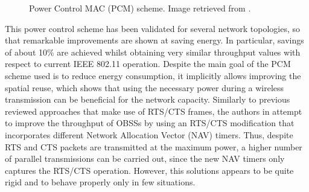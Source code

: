 \documentclass[12pt, a4paper,twoside]{tesi_upf}
\begin{document}
				\begin{figure}[h!]
					\centering
					\caption{Power Control MAC (PCM) scheme. Image retrieved from \cite{pursley2000energy}.}
					\label{fig:pcm}
				\end{figure}
				This power control scheme has been validated for several network topologies, so that remarkable improvements are shown at saving energy. In particular, savings of about 10\% are achieved whilst obtaining very similar throughput values with respect to current IEEE 802.11 operation. Despite the main goal of the PCM scheme used is to reduce energy consumption, it implicitly allows improving the spatial reuse, which shows that using the necessary power during a wireless transmission can be beneficial for the network capacity. Similarly to previous reviewed approaches that make use of RTS/CTS frames, the authors in \cite{lei2015performance} attempt to improve the throughput of OBSSs by using an RTS/CTS modification that incorporates different Network Allocation Vector (NAV) timers. Thus, despite RTS and CTS packets are transmitted at the maximum power, a higher number of parallel transmissions can be carried out, since the new NAV timers only captures the RTS/CTS operation. However, this solutions appears to be quite rigid and to behave properly only in few situations.
				
\end{document}
